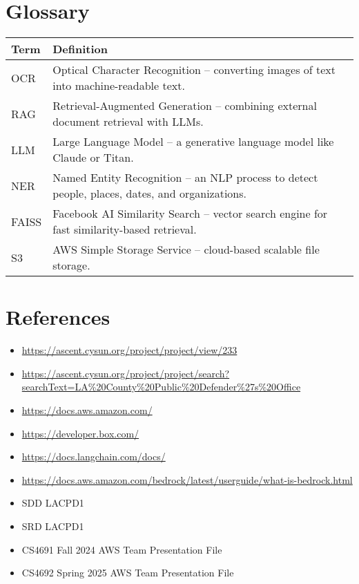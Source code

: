 \documentclass[11pt]{article}
\begin{document}
\section{Glossary}
\begin{longtable}{|l|p{10cm}|}
\hline
\textbf{Term} & \textbf{Definition} \\
\hline
OCR & Optical Character Recognition – converting images of text into machine-readable text. \\
RAG & Retrieval-Augmented Generation – combining external document retrieval with LLMs. \\
LLM & Large Language Model – a generative language model like Claude or Titan. \\
NER & Named Entity Recognition – an NLP process to detect people, places, dates, and organizations. \\
FAISS & Facebook AI Similarity Search – vector search engine for fast similarity-based retrieval. \\
S3 & AWS Simple Storage Service – cloud-based scalable file storage. \\
\hline
\end{longtable}

\newpage
\section{References}
\begin{itemize}
\item \url{https://ascent.cysun.org/project/project/view/233}
\item \url{https://ascent.cysun.org/project/project/search?searchText=LA%20County%20Public%20Defender%27s%20Office}
\item \url{https://docs.aws.amazon.com/}
\item \url{https://developer.box.com/}
\item \url{https://docs.langchain.com/docs/}
\item \url{https://docs.aws.amazon.com/bedrock/latest/userguide/what-is-bedrock.html}
\item SDD LACPD1
\item SRD LACPD1
\item CS4691 Fall 2024 AWS Team Presentation File
\item CS4692 Spring 2025 AWS Team Presentation File
\end{itemize}
\end{document}
